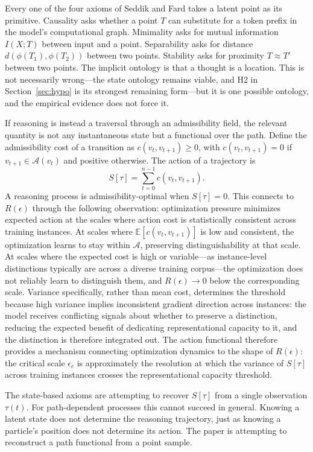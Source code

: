 \documentclass[11pt]{article}
\begin{document}
Every one of the four axioms of Seddik and Fard takes a latent point as its primitive.
Causality asks whether a point $T$ can substitute for a token prefix in the model's
computational graph. Minimality asks for mutual information $I(X;T)$ between input and a point.
Separability asks for distance $d(\phi(T_1), \phi(T_2))$ between two points. Stability asks for
proximity $T \approx T'$ between two points. The implicit ontology is that a thought is a
location. This is not necessarily wrong---the state ontology remains viable, and H2 in
Section~\ref{sec:hypo} is its strongest remaining form---but it is one possible ontology, and
the empirical evidence does not force it.

If reasoning is instead a traversal through an admissibility field, the relevant quantity is not
any instantaneous state but a functional over the path. Define the admissibility cost of a
transition as $c(v_t, v_{t+1}) \geq 0$, with $c(v_t, v_{t+1}) = 0$ if
$v_{t+1} \in \mathcal{A}(v_t)$ and positive otherwise. The action of a trajectory is
\begin{equation}
S[\tau] = \sum_{t=0}^{n-1} c(v_t, v_{t+1}).
\end{equation}
A reasoning process is admissibility-optimal when $S[\tau] = 0$. This connects to $R(\epsilon)$
through the following observation: optimization pressure minimizes expected action at the scales
where action cost is statistically consistent across training instances. At scales where
$\mathbb{E}[c(v_t, v_{t+1})]$ is low and consistent, the optimization learns to stay within
$\mathcal{A}$, preserving distinguishability at that scale. At scales where the expected cost is
high or variable---as instance-level distinctions typically are across a diverse training
corpus---the optimization does not reliably learn to distinguish them, and $R(\epsilon) \to 0$
below the corresponding scale. Variance specifically, rather than mean cost, determines the
threshold because high variance implies inconsistent gradient direction across instances:
the model receives conflicting signals about whether to preserve a distinction, reducing the
expected benefit of dedicating representational capacity to it, and the distinction is
therefore integrated out. The action functional therefore provides a mechanism connecting
optimization dynamics to the shape of $R(\epsilon)$: the critical scale $\epsilon_c$ is
approximately the resolution at which the variance of $S[\tau]$ across training instances
crosses the representational capacity threshold.

The state-based axioms are attempting to recover $S[\tau]$ from a single observation $\tau(t)$.
For path-dependent processes this cannot succeed in general. Knowing a latent state does not
determine the reasoning trajectory, just as knowing a particle's position does not determine
its action. The paper is attempting to reconstruct a path functional from a point sample.
\end{document}
